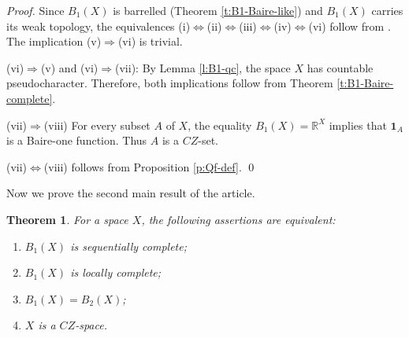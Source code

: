 \documentclass[preprint,11pt]{elsarticle}
\newtheorem{theorem}{Theorem}[section]
\numberwithin{equation}{section}
\numberwithin{theorem}{section}
\newcommand{\IR}{\mathbb{R}}
\newcommand{\Ra}{\Rightarrow}
\newcommand{\LRa}{\Leftrightarrow}
\begin{document}
\begin{proof}
Since $B_1(X)$ is barrelled (Theorem \ref{t:B1-Baire-like}) and $B_1(X)$ carries its weak topology, the equivalences (i)$\LRa$(ii)$\LRa$(iii)$\LRa$(iv)$\LRa$(vi) follow from \cite[Proposition~11.4.2]{Jar}. The  implication (v)$\Ra$(vi) is trivial.
\smallskip

(vi)$\Ra$(v) and (vi)$\Ra$(vii): By Lemma \ref{l:B1-qc}, the space $X$ has countable pseudocharacter. Therefore, both  implications follow from Theorem \ref{t:B1-Baire-complete}.
\smallskip

(vii)$\Ra$(viii) For every subset $A$ of $X$, the equality $B_1(X)=\IR^X$ implies that $\mathbf{1}_A$ is a Baire-one function. Thus $A$ is a $CZ$-set.
\smallskip

(vii)$\LRa$(viii) follows from Proposition \ref{p:Qf-def}.
\qed
\end{proof}



Now we prove the second main result of the article.

\begin{theorem}\label{t:B1-lc}
For a space $X$, the following assertions are equivalent:
\begin{enumerate}
\item[{\rm(i)}] $B_1(X)$ is sequentially complete;
\item[{\rm(ii)}] $B_1(X)$ is locally complete;
\item[{\rm(iii)}] $B_1(X)=B_2(X)$;
\item[{\rm(iv)}]   $X$ is a $CZ$-space.
\end{enumerate}
\end{theorem}
\end{document}
